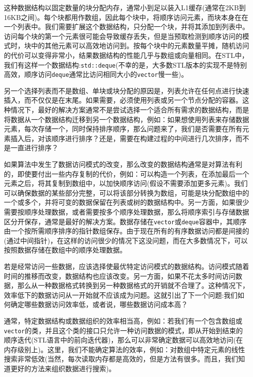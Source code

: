 这种数据结构以固定数量的块分配内存，通常小到足以装入L1缓存(通常在2KB到16KB之间)。每个块都用作数组，因此每个块中，将顺序访问元素，而块本身在在一个列表中。我们需要扩展这个数据结构，只分配一个块，并将其添加到列表中。访问每个块的第一个元素很可能会导致缓存丢失，但是当预取检测到顺序访问的模式时，块中的其他元素可以高效地访问到。按每个块中的元素数量平摊，随机访问的代价可以变得非常小，结果数据结构的性能几乎与数组或向量相同。在STL中，我们有这样一个数据结构:\texttt{std::deque}(不幸的是，大多数STL版本的实现不是特别高效，顺序访问\texttt{deque}通常比访问相同大小的\texttt{vector}慢一些)。

另一个选择列表而不是数组、单块或块分配的原因是，列表允许在任何点进行快速插入，而不仅仅是在末尾。如果需要，必须使用列表或另一个节点分配的容器。这种情况下，最好的解决方案通常不是尝试选择一个适合所有需求的数据结构，而是将数据从一个数据结构迁移到另一个数据结构，例如：如果想使用列表来存储数据元素，每次存储一个，同时保持排序顺序，那么问题来了，我们是否需要在所有元素插入后，对该顺序进行排序？还是，需要在构建过程的中间进行几次排序，而不是一直进行排序？

如果算法中发生了数据访问模式的改变，那么改变的数据结构通常是对算法有利的，即使要付出一些内存复制的代价，例如：可以构造一个列表，在添加最后一个元素之后，将其复制到数组中，以加快顺序访问(假设不需要添加更多元素)。我们可以确保数据的某些部分完整，可以将该部分转换为数组，可能是块分配数组中的一个或多个，并将可变的数据保留在列表或树的数据结构中。另一方面，如果很少需要按顺序处理数据，或者需要按多个顺序处理数据，那么将顺序索引与存储数据区分开保存，通常是最好的解决方案。数据存储在\texttt{vector}或\texttt{deque}容器中，其顺序由一个按所需顺序排序的指针数组保存。由于现在所有的有序数据访问都是间接的(通过中间指针)，在这样的访问很少的情况下这没问题，而在大多数情况下，可以按照数据存储在数组中的顺序处理数据。

若是经常访问一些数据，应该选择使最优特定访问模式的数据结构。访问模式随着时间的推移而改变，数据结构也应该改变。另一方面，如果不花太多时间访问数据，那么从一种数据格式转换到另一种数据格式的开销就不合理了。这种情况下，效率低下的数据访问从一开始就不应该成为问题。这就引出了下一个问题:我们如何确定哪些数据访问效率低，或者说，哪些数据访问成本高？


通常，特定数据结构或数据组织的效率相当高，例如：若我们有一个包含数组或\texttt{vector}的类，并且这个类的接口只允许一种访问数据的模式，即从开始到结束的顺序迭代(STL语言中的前向迭代器)，那么可以非常确定数据可以高效地访问(在内存级别上)。这里，我们不能确定算法的效率，例如：对数组中特定元素的线性搜索非常低效(当然，每次读取内存都是高效的，但是方法有很多。而且，我们知道更好的方法来组织数据进行搜索)。

